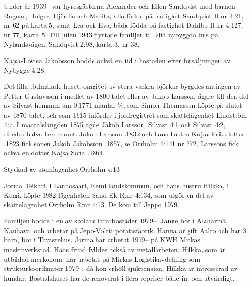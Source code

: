 Under år 1939-- var hyresgästerna Alexander och Ellen Sandqvist med barnen Ragnar, Holger, Hjördis och Marita, alla födda på fastighet Sandqvist R:nr 4:21, nr 62 på karta 5, samt Lea och Eva, båda födda på fastighet Dahlbo R:nr 4:127, nr 77, karta 5.	Till julen 1943 flyttade familjen till sitt nybyggda hus på Nylandsvägen, Sandqvist 2:98, karta 3, nr 38.

Kajsa-Lovisa Jakobsson bodde också en tid i bostaden efter försäljningen av Nybygge 4:28.

Det lilla rödmålade huset, omgivet av stora vackra björkar byggdes antingen av Petter Gustavsson i medlet av 1800-talet eller av Jakob Larsson, ägare till den del av Silvast hemman om 0,1771 mantal ¼, som Simon Thomasson köpte på slutet av 1870-talet, och som 1915 infördes i jordregistret som skattelägenhet Lindström 4:7. I mantalslängden 1875 ägde Jakob Larsson, Silvast 4:1 och Silvast 4:2, således halva hemmanet.	Jakob Larsson .1832 och hans hustru Kajsa Eriksdotter .1823 fick sonen Jakob Jakobsson .1857, se Orrholm 	4:141 nr 372. Larssons fick också en dotter Kajsa Sofia .1864.




Styckad av stomlägenhet Orrholm 4:13


Jorma Teikari,  i Lauhosaari, Kemi landskommun, och hans 	hustru Hilkka,  i Kemi, köpte 1982 lägenheten Sand-Ek R:nr 4:134, som utgör en del av skattelägenhet Orrholm R:nr 4:13. De kom till Jeppo 1979.
\begin{jhchildren}
  \item {}
  \item {}
\end{jhchildren}
Familjen bodde i en av skolans lärarbostäder 1979--.	Janne bor i Alahärmä, Kauhava, och arbetar på Jepo-Voltti potatisfabrik. Hanna är gift Aalto och har 3 barn, bor i Tavastehus. Jorma har arbetat 1979-- på KWH Mirkas maskinverkstad. Hans fritid fylldes också av metallarbeten. Hilkka, som är utbildad merkonom, har arbetat på Mirkas Logistikavdelning som strukturkoordinator	1979--, då hon erhöll sjukpension. Hilkka är intresserad av hundar. Bostadshuset har de renoverat i flera repriser både in- och utvändigt.


